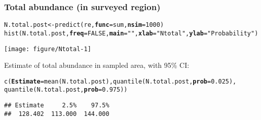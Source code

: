 \documentclass[color=usenames,dvipsnames]{beamer}\usepackage[]{graphicx}\usepackage[]{color}
\makeatletter
\newcommand{\hlnum}[1]{\textcolor[rgb]{0.69,0.494,0}{#1}}%
\newcommand{\hlstr}[1]{\textcolor[rgb]{0.749,0.012,0.012}{#1}}%
\newcommand{\hlopt}[1]{\textcolor[rgb]{0,0,0}{#1}}%
\newcommand{\hlstd}[1]{\textcolor[rgb]{0,0,0}{#1}}%
\newcommand{\hlkwb}[1]{\textcolor[rgb]{0,0.341,0.682}{#1}}%
\newcommand{\hlkwc}[1]{\textcolor[rgb]{0,0,0}{\textbf{#1}}}%
\newcommand{\hlkwd}[1]{\textcolor[rgb]{0.004,0.004,0.506}{#1}}%
\newenvironment{kframe}{%
 \def\at@end@of@kframe{}%
 \ifinner\ifhmode%
  \def\at@end@of@kframe{\end{minipage}}%
  \begin{minipage}{\columnwidth}%
 \fi\fi%
 \def\FrameCommand##1{\hskip\@totalleftmargin \hskip-\fboxsep
 \colorbox{shadecolor}{##1}\hskip-\fboxsep
     \hskip-\linewidth \hskip-\@totalleftmargin \hskip\columnwidth}%
 \MakeFramed {\advance\hsize-\width
   \@totalleftmargin\z@ \linewidth\hsize
   \@setminipage}}%
 {\par\unskip\endMakeFramed%
 \at@end@of@kframe}
\newenvironment{knitrout}{}{} %
\makeatother
\begin{document}





\begin{frame}[fragile]
  \frametitle{Total abundance (in surveyed region)}
  \footnotesize
\begin{knitrout}\scriptsize
{}\color{fgcolor}\begin{kframe}
\begin{alltt}
\hlstd{N.total.post} \hlkwb{<-} \hlkwd{predict}\hlstd{(re,} \hlkwc{func}\hlstd{=sum,} \hlkwc{nsim}\hlstd{=}\hlnum{1000}\hlstd{)}
\hlkwd{hist}\hlstd{(N.total.post,} \hlkwc{freq}\hlstd{=}\hlnum{FALSE}\hlstd{,} \hlkwc{main}\hlstd{=}\hlstr{""}\hlstd{,} \hlkwc{xlab}\hlstd{=}\hlstr{"N total"}\hlstd{,} \hlkwc{ylab}\hlstd{=}\hlstr{"Probability"}\hlstd{)}
\end{alltt}
\end{kframe}

{\centering \texttt{[image: figure/Ntotal-1]} 

}


\end{knitrout}
Estimate of total abundance in sampled area, with 95\% CI:
\begin{knitrout}\scriptsize
{}\color{fgcolor}\begin{kframe}
\begin{alltt}
\hlkwd{c}\hlstd{(}\hlkwc{Estimate}\hlstd{=}\hlkwd{mean}\hlstd{(N.total.post),} \hlkwd{quantile}\hlstd{(N.total.post,} \hlkwc{prob}\hlstd{=}\hlnum{0.025}\hlstd{),}
  \hlkwd{quantile}\hlstd{(N.total.post,} \hlkwc{prob}\hlstd{=}\hlnum{0.975}\hlstd{))}
\end{alltt}
\begin{verbatim}
## Estimate     2.5%    97.5% 
##  128.402  113.000  144.000
\end{verbatim}
\end{kframe}
\end{knitrout}
\end{frame}
\end{document}
